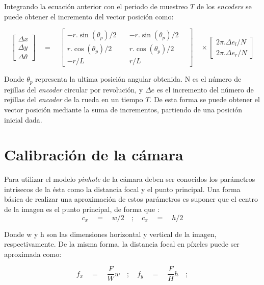 Integrando la ecuación anterior con el periodo de muestreo $T$ de los \textit{encoders} se puede obtener el incremento del vector posición como:

\begin{equation}
\label{eq:CineDirectoDelta}
\begin{bmatrix} \Delta x \\ \Delta y \\ \Delta \theta  \end{bmatrix}\quad =\quad \begin{bmatrix} -r.\sin { ({ \theta  }_{ p })/2\quad  }  & -r.\sin { ({ \theta  }_{ p })/2\quad  }  \\ r.\cos { ({ \theta  }_{ p })/2 }  & r.\cos { ({ \theta  }_{ p })/2 }  \\ -r/L & r/L \end{bmatrix}\quad \times \begin{bmatrix} { 2\pi .\Delta e }_{ l }/N \\ { 2\pi .\Delta e }_{ r }/N \end{bmatrix}
\end{equation}

Donde ${ \theta  }_{ p }$ representa la ultima posición angular obtenida. N es el número de rejillas del \textit{encoder} circular por revolución, y $\Delta e$ es el incremento del número de rejillas del \textit{encoder} de la rueda en un tiempo $T$. De esta forma se puede obtener el vector posición mediante la suma de incrementos, partiendo de una posición inicial dada.


\section{Calibración de la cámara}

Para utilizar el modelo \textit{pinhole} de la cámara deben ser conocidos los parámetros intrísecos de la ésta como la distancia focal y el punto principal. Una forma básica de realizar una aproximación de estos parámetros es suponer que el centro de la imagen es el punto principal, de forma que :
\begin{equation}
{ c }_{ x }\quad =\quad w/2\quad ;\quad { c }_{ x }\quad =\quad h/2
\end{equation}

Donde w y h son las dimensiones horizontal y vertical de la imagen, respectivamente. De la misma forma, la distancia focal en píxeles puede ser aproximada como:

\begin{equation}
	{ f }_{ x }\quad =\quad \frac { F }{ W } w\quad ;\quad { f }_{ y }\quad =\quad \frac { F }{ H } h\quad ;
\end{equation}

